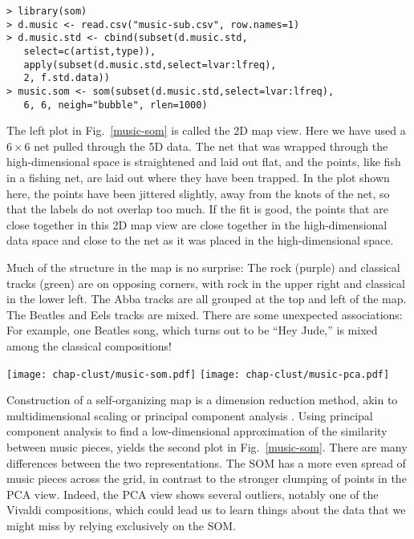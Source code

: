 \begin{verbatim}
> library(som)
> d.music <- read.csv("music-sub.csv", row.names=1)
> d.music.std <- cbind(subset(d.music.std,
   select=c(artist,type)),
   apply(subset(d.music.std,select=lvar:lfreq), 
   2, f.std.data))
> music.som <- som(subset(d.music.std,select=lvar:lfreq), 
   6, 6, neigh="bubble", rlen=1000)
\end{verbatim}

The left plot in Fig.~\ref{music-som} is called the 2D map
view. Here we have used a $6\times 6$ net pulled through the 5D
data. The net that was wrapped through the high-dimensional space is
straightened and laid out flat, and the points, like fish in a fishing
net, are laid out where they have been trapped. In the plot shown
here, the points have been jittered slightly, away from the knots of
the net, so that the labels do not overlap too much. If the fit is
good, the points that are close together in this 2D map view are close
together in the high-dimensional data space and close to the net
as it was placed in the high-dimensional space.

Much of the structure in the map is no surprise: The rock (purple) and
classical tracks (green) are on opposing corners, with rock in the
upper right and classical in the lower left. The Abba tracks are all
grouped at the top and left of the map. The Beatles and Eels tracks
are mixed. There are some unexpected associations: For example, one
Beatles song, which turns out to be ``Hey Jude,'' is mixed among the
classical compositions!

\begin{figure*}[htbp]
\centerline{
  {\texttt{[image: chap-clust/music-som.pdf]}}
  {\texttt{[image: chap-clust/music-pca.pdf]}}
}
\caption[Comparison of clustering music tracks using a self-organizing
map versus principal components]{Comparison of clustering music
tracks using a self-organizing map versus principal components.
The data was clustered using a self-organizing map, as shown in a 2D
map view.  (When tracks clustered at a node, jittering was used to
spread the labels.)  Compare with the scatterplot of the first two
principal components.}
\label{music-som}
\end{figure*}

Construction of a self-organizing map is a dimension reduction method,
akin to multidimensional scaling \cite{BG05} or principal component
analysis \cite{JW02}. Using principal component analysis to find a
low-dimensional approximation of the similarity between music pieces,
yields the second plot in Fig.~\ref{music-som}. There are many
differences between the two representations. The SOM has a more even
spread of music pieces across the grid, in contrast to the stronger
clumping of points in the PCA view.  Indeed, the PCA view shows
several outliers, notably one of the Vivaldi compositions, which could
lead us to learn things about the data that we might miss by relying
exclusively on the SOM.

